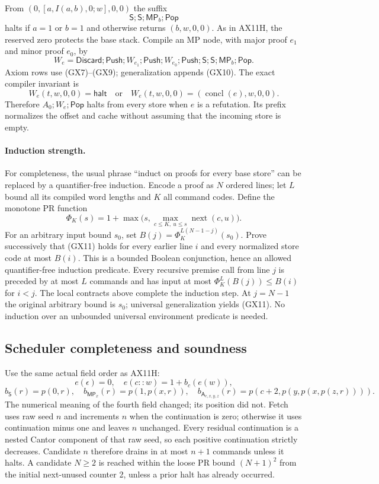 From $(0,[a,I(a,b),0;w],0,0)$ the suffix
\[
                    \mathsf S;\mathsf S;\mathsf{MP}_b;\mathsf{Pop}
\]
halts if $a=1$ or $b=1$ and otherwise returns $(b,w,0,0)$.
As in AX11H, the reserved zero protects the base stack.  Compile an MP
node, with major proof $e_1$ and minor proof $e_0$, by
\[
 W_e=\mathsf{Discard};\mathsf{Push};W_{e_1};\mathsf{Push};
 W_{e_0};\mathsf{Push};\mathsf S;\mathsf S;\mathsf{MP}_b;\mathsf{Pop}.
\]
Axiom rows use (GX7)--(GX9); generalization appends (GX10).  The exact
compiler invariant is
\[
 W_e(t,w,0,0)=\mathsf{halt}\quad\text{or}\quad
 W_e(t,w,0,0)=(\operatorname{concl}(e),w,0,0).            \tag{GX11}
\]
Therefore $A_0;W_e;\mathsf{Pop}$ halts from every store when $e$ is a
refutation.  Its prefix normalizes the offset and cache without assuming
that the incoming store is empty.

\paragraph{Induction strength.}
For completeness, the usual phrase ``induct on proofs for every base
store'' can be replaced by a quantifier-free induction.  Encode a proof
as $N$ ordered lines; let $L$ bound all its compiled word lengths and $K$
all command codes.  Define the monotone PR function
\[
 \Phi_K(s)=1+\max\bigl(s,\max_{c\le K,\ u\le s}\operatorname{next}(c,u)\bigr).
\]
For an arbitrary input bound $s_0$, set
$B(j)=\Phi_K^{L(N-1-j)}(s_0)$.  Prove successively that (GX11) holds
for every earlier line $i$ and every normalized store code at most
$B(i)$.  This is a bounded Boolean conjunction, hence an allowed
quantifier-free induction predicate.  Every recursive premise call from
line $j$ is preceded by at most $L$ commands and has input at most
$\Phi_K^L(B(j))\le B(i)$ for $i<j$.  The local contracts above complete
the induction step.  At $j=N-1$ the original arbitrary bound is $s_0$;
universal generalization yields (GX11).  No induction over an unbounded
universal environment predicate is needed.

\subsection{Scheduler completeness and soundness}

Use the same actual field order as AX11H:
\[
 e(\epsilon)=0,\quad e(c::w)=1+b_c(e(w)),
\]
\[
 b_{\mathsf S}(r)=p(0,r),\quad
 b_{\mathsf{MP}_x}(r)=p(1,p(x,r)),\quad
 b_{\mathsf A_{c,x,y,z}}(r)=p(c+2,p(y,p(x,p(z,r)))).       \tag{GX12}
\]
The numerical meaning of the fourth field changed; its position did not.
Fetch uses raw seed $n$ and increments $n$ when the continuation is zero;
otherwise it uses continuation minus one and leaves $n$ unchanged.
Every residual continuation is a nested Cantor component of that raw
seed, so each positive continuation strictly decreases.  Candidate $n$
therefore drains in at most $n+1$ commands unless it halts.  A candidate
$N\ge2$ is reached within the loose PR bound $(N+1)^2$ from the initial
next-unused counter 2, unless a prior halt has already occurred.

